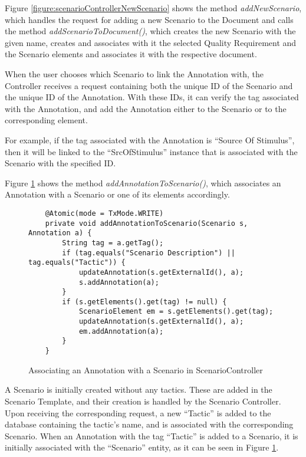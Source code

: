 Figure \ref{figure:scenarioControllerNewScenario} shows the method \textit{addNewScenario}, which handles the request for adding a new Scenario to the Document and calls the method \textit{addScenarioToDocument()}, which creates the new Scenario with the given name, creates and associates with it the selected Quality Requirement and the Scenario elements and associates it with the respective document.

When the user chooses which Scenario to link the Annotation with, the Controller receives a request containing both the unique ID of the Scenario and the unique ID of the Annotation. With these IDs, it can verify the tag associated with the Annotation, and add the Annotation either to the Scenario or to the corresponding element. 

For example, if the tag associated with the Annotation is ``Source Of Stimulus'', then it will be linked to the ``SrcOfStimulus'' instance that is associated with the Scenario with the specified ID.

Figure \ref{figure:scenarioControllerLinkAnnotation} shows the method \textit{addAnnotationToScenario()}, which associates an Annotation with a Scenario or one of its elements accordingly.

\begin{figure}[h]
\lstset{style=customjava}
\begin{lstlisting}
	@Atomic(mode = TxMode.WRITE)
	private void addAnnotationToScenario(Scenario s, Annotation a) {
		String tag = a.getTag();
		if (tag.equals("Scenario Description") || tag.equals("Tactic")) {
			updateAnnotation(s.getExternalId(), a);
			s.addAnnotation(a);
		}
		if (s.getElements().get(tag) != null) {
			ScenarioElement em = s.getElements().get(tag);
			updateAnnotation(s.getExternalId(), a);
			em.addAnnotation(a);
		}
	}	
\end{lstlisting}
\caption{Associating an Annotation with a Scenario in ScenarioController}
\label{figure:scenarioControllerLinkAnnotation}
\end{figure}

A Scenario is initially created without any tactics. These are added in the Scenario Template, and their creation is handled by the Scenario Controller. Upon receiving the corresponding request, a new ``Tactic'' is added to the database containing the tactic's name, and is associated with the corresponding Scenario. When an Annotation with the tag ``Tactic'' is added to a Scenario, it is initially associated with the ``Scenario'' entity, as it can be seen in Figure \ref{figure:scenarioControllerLinkAnnotation}. 

